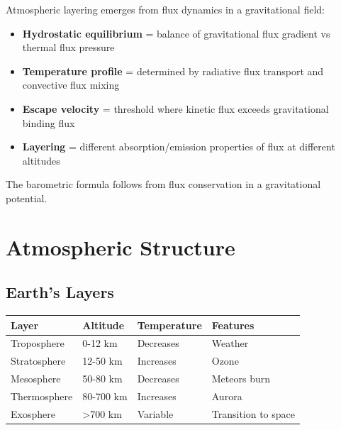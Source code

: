 \documentclass[
  11pt,
  letterpaper,
  twoside,
  openright]{book}
\providecommand{\tightlist}{%
  \setlength{\itemsep}{0pt}\setlength{\parskip}{0pt}}
\begin{document}
\begin{tcolorbox}[enhanced jigsaw, coltitle=black, colbacktitle=quarto-callout-note-color!10!white, toprule=.15mm, colframe=quarto-callout-note-color-frame, arc=.35mm, opacityback=0, bottomtitle=1mm, toptitle=1mm, breakable, colback=white, titlerule=0mm, opacitybacktitle=0.6, title=\textcolor{quarto-callout-note-color}{\faInfo}\hspace{0.5em}{How FTD Produces Atmospheric Structure}, rightrule=.15mm, bottomrule=.15mm, leftrule=.75mm, left=2mm]

Atmospheric layering emerges from flux dynamics in a gravitational
field:

\begin{itemize}
\tightlist
\item
  \textbf{Hydrostatic equilibrium} = balance of gravitational flux
  gradient vs thermal flux pressure
\item
  \textbf{Temperature profile} = determined by radiative flux transport
  and convective flux mixing
\item
  \textbf{Escape velocity} = threshold where kinetic flux exceeds
  gravitational binding flux
\item
  \textbf{Layering} = different absorption/emission properties of flux
  at different altitudes
\end{itemize}

The barometric formula follows from flux conservation in a gravitational
potential.

\end{tcolorbox}

\section{Atmospheric Structure}\label{atmospheric-structure}

\subsection{Earth's Layers}\label{earths-layers-1}

\begin{longtable}[]{@{}llll@{}}
\toprule\noalign{}
Layer & Altitude & Temperature & Features \\
\midrule\noalign{}
\endhead
\bottomrule\noalign{}
\endlastfoot
Troposphere & 0-12 km & Decreases & Weather \\
Stratosphere & 12-50 km & Increases & Ozone \\
Mesosphere & 50-80 km & Decreases & Meteors burn \\
Thermosphere & 80-700 km & Increases & Aurora \\
Exosphere & \textgreater700 km & Variable & Transition to space \\
\end{longtable}
\end{document}
